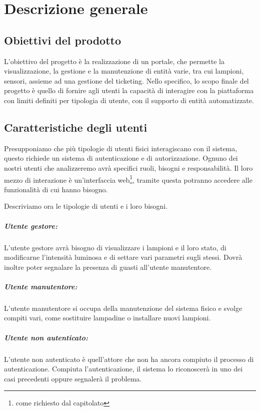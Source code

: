\chapter{Descrizione generale}

\section{Obiettivi del prodotto}
L'obiettivo del progetto è la realizzazione di un portale, che permette la visualizzazione, la gestione e la manutenzione di entità varie, tra cui lampioni, sensori, assieme ad una gestione del ticketing.
Nello specifico, lo scopo finale del progetto è quello di fornire agli utenti la capacità di interagire con la piattaforma con limiti definiti per tipologia di utente, con il supporto di entità automatizzate.

\section{Caratteristiche degli utenti}

Presupponiamo che più tipologie di utenti fisici interagiscano con il sistema, questo richiede un sistema di autenticazione e di autorizzazione.
Ognuno dei nostri utenti che analizzeremo avrà specifici ruoli, bisogni e responsabilità.
Il loro mezzo di interazione è un'interfaccia web\footnote{come richiesto dal capitolato}, tramite questa potranno accedere alle funzionalità di cui hanno bisogno.

Descriviamo ora le tipologie di utenti e i loro bisogni.

\paragraph{Utente gestore:} L'utente gestore avrà bisogno di visualizzare i lampioni e il loro stato, di modificarne l'intensità luminosa e di settare vari parametri sugli stessi. Dovrà inoltre poter segnalare la presenza di guasti all'utente manutentore.

\paragraph{Utente manutentore:} L'utente manutentore si occupa della manutenzione del sistema fisico e svolge compiti vari, come sostituire lampadine o installare nuovi lampioni.

\paragraph{Utente non autenticato:} L'utente non autenticato è quell'attore che non ha ancora compiuto il processo di autenticazione. Compiuta l'autenticazione, il sistema lo riconoscerà in uno dei casi precedenti oppure segnalerà il problema.

